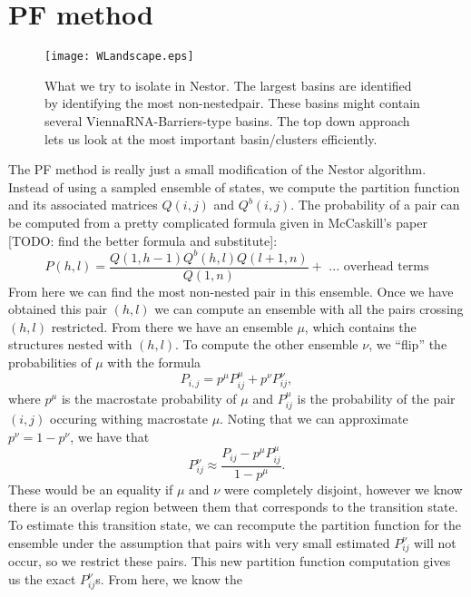 \section{PF method}
\begin{figure}[t]
\center
\texttt{[image: WLandscape.eps]}
\caption{What we try to isolate in Nestor. The largest basins are
  identified by identifying the most non-nestedpair. These basins
  might contain several ViennaRNA-Barriers-type basins. The top down
  approach lets us look at the most important basin/clusters
  efficiently.}
\label{fig:landscape}
\end{figure}

The PF method is really just a small modification of the Nestor
algorithm. Instead of using a sampled ensemble of states, we compute
the partition function and its associated matrices $Q(i, j)$ and
$Q^b(i,j)$. The probability of a pair can be computed from a pretty
complicated formula given in McCaskill's paper
\cite{mccaskill1990equilibrium} [TODO: find the better formula and
  substitute]:
\begin{equation}
P(h,l) = \frac{Q(1, h-1) Q^b(h,l) Q(l+1, n)}{Q(1, n)} + \text{ ... overhead terms}
\end{equation}
From here we can find the most non-nested pair in this ensemble. Once
we have obtained this pair $(h, l)$ we can compute an ensemble with
all the pairs crossing $(h, l)$ restricted. From there we have an
ensemble $\mu$, which contains the structures nested with $(h,l)$. To
compute the other ensemble $\nu$, we ``flip'' the probabilities of $\mu$
with the formula
\begin{equation}
P_{i,j} = p^\mu P^\mu_{ij} + p^\nu P^\nu_{ij},
\end{equation}
where $p^\mu$ is the macrostate probability of $\mu$ and $P^\mu_{ij}$
is the probability of the pair $(i,j)$ occuring withing macrostate
$\mu$. Noting that we can approximate $p^\nu = 1 - p^\nu$, we have
that
\begin{equation}
P^\nu_{ij} \approx \frac{P_{ij} - p^\mu P^\mu_{ij}}{1 - p^\mu}.
\end{equation}
These would be an equality if $\mu$ and $\nu$ were completely
disjoint, however we know there is an overlap region between them that
corresponds to the transition state. To estimate this transition
state, we can recompute the partition function for the ensemble under
the assumption that pairs with very small estimated $P^\nu_{ij}$ will
not occur, so we restrict these pairs. This new partition function
computation gives us the exact $P^\nu_{ij}$s. From here, we know the
